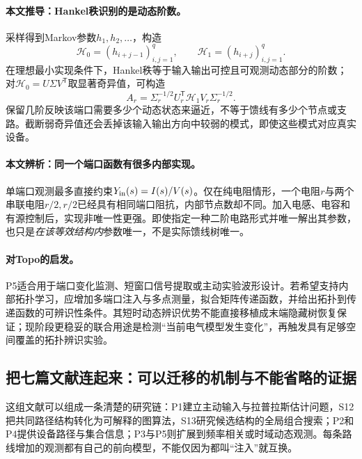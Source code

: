 \paragraph{本文推导：Hankel秩识别的是动态阶数。}
采样得到Markov参数$h_1,h_2,\ldots$，构造
\begin{equation}
 \mathcal H_0=(h_{i+j-1})_{i,j=1}^{q},\qquad
 \mathcal H_1=(h_{i+j})_{i,j=1}^{q}.
 \label{eq:p5-hankel}
\end{equation}
在理想最小实现条件下，Hankel秩等于输入输出可控且可观测动态部分的阶数；对$\mathcal H_0=U\Sigma V^{\mathsf T}$取显著奇异值，可构造
\begin{equation}
 A_r=\Sigma_r^{-1/2}U_r^{\mathsf T}\mathcal H_1V_r\Sigma_r^{-1/2}.
 \label{eq:p5-era}
\end{equation}
保留几阶反映该端口需要多少个动态状态来逼近，不等于馈线有多少个节点或支路。截断弱奇异值还会丢掉该输入输出方向中较弱的模式，即使这些模式对应真实设备。

\paragraph{本文辨析：同一个端口函数有很多内部实现。}
单端口观测最多直接约束$Y_{\rm in}(s)=I(s)/V(s)$。仅在纯电阻情形，一个电阻$r$与两个串联电阻$r/2,r/2$已经具有相同端口阻抗，内部节点数却不同。加入电感、电容和有源控制后，实现非唯一性更强。即使指定一种二阶电路形式并唯一解出其参数，也只是\emph{在该等效结构内}参数唯一，不是实际馈线树唯一。

\paragraph{对Topo的启发。}
P5适合用于端口变化监测、短窗口信号提取或主动实验波形设计。若希望支持内部拓扑学习，应增加多端口注入与多点测量，拟合矩阵传递函数，并给出拓扑到传递函数的可辨识性条件。其短时动态辨识优势不能直接移植成末端隐藏树恢复保证；现阶段更稳妥的联合用途是检测“当前电气模型发生变化”，再触发具有足够空间覆盖的拓扑辨识实验。

\subsection{把七篇文献连起来：可以迁移的机制与不能省略的证据}

这组文献可以组成一条清楚的研究链：P1建立主动输入与拉普拉斯估计问题，S12把共同路径结构转化为可解释的图算法，S13研究候选结构的全局组合搜索；P2和P4提供设备路径与集合信息；P3与P5则扩展到频率相关或时域动态观测。每条路线增加的观测都有自己的前向模型，不能仅因为都叫“注入”就互换。

